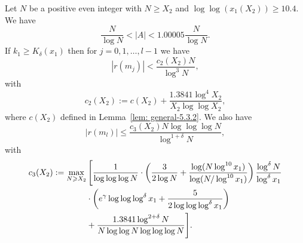 \documentclass[12pt]{amsart}
\begin{document}
\begin{lemma}
\label{lemma:r}
Let $N$ be a positive even integer with $N\ge X_2$ and $\log\log(x_1(X_2))\ge 10.4$. We have
\begin{equation}
\label{eq:A>}
    \frac{N}{\log N}<\left|A\right|<1.00005\frac{N}{\log N}.
\end{equation}
If $k_1\ge K_{\delta}(x_1)$ then for $j=0,1,\ldots,l-1$ we have
\begin{equation}
\label{eq:rj}
\left|r(m_j)\right|<\frac{c_2(X_2)N}{\log^3N},
\end{equation}
with 
\begin{equation} \label{eq: def-c-2}
c_2(X_2):=c(X_2)+\frac{1.3841\log^4 X_2}{X_2\log\log X_2},
\end{equation}
where $c(X_2)$ defined in Lemma~\ref{lem: general-5.3.2}.
We also have
\begin{equation}
\label{eq:rl}
\left|r(m_l)\right|\le\frac{c_3(X_2) N \log \log \log N}{\log^{1+\delta}N},
\end{equation}
with
\begin{align}
    c_3(X_2)&:=\max_{N\ge X_2}\Bigg[\frac{1}{\log\log\log N}\cdot\left(\frac{3}{2\log N}+\frac{\log(N\log^{10}x_1)}{\log(N/\log^{10}x_1)}\right)\frac{\log^\delta N}{\log^\delta x_1}\label{eq: def-c-3}\\
    &\qquad\qquad\cdot\left(e^\gamma\log\log\log^\delta x_1+\frac{5}{2\log\log\log^{\delta}x_1}\right)\notag\\
    &\qquad\qquad+\frac{1.3841\log^{2+\delta}N}{N\log\log N\log\log\log N}\Bigg].\notag
\end{align}
\end{lemma}
\end{document}

